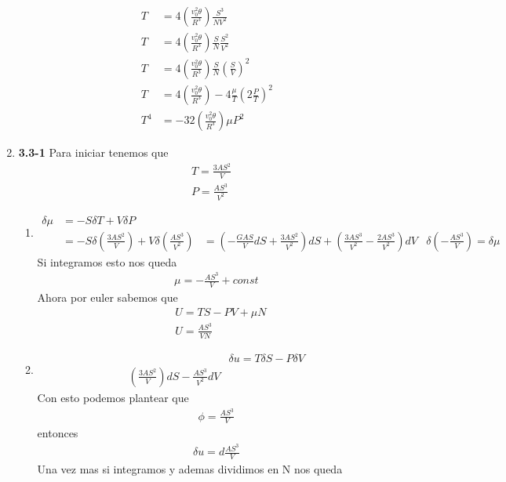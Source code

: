 \documentclass[12pt]{exam}
\begin{document}
\begin{enumerate}
		\begin{align*}
			T &= 4\left(\frac{v_0^2\theta}{R^3}\right)\frac{S^3}{NV^2}\\
			T &= 4\left(\frac{v_0^2\theta}{R^3}\right)\frac{S}{N}\frac{S^2}{V^2}\\
			T &= 4\left(\frac{v_0^2\theta}{R^3}\right)\frac{S}{N}\left(\frac{S}{V}\right)^2\\
			T &= 4\left(\frac{v_0^2\theta}{R^3}\right)-4\frac{\mu}{T}\left(2\frac{P}{T}\right)^2\\
			T^4 &= -32\left(\frac{v_0^2\theta}{R^3}\right)\mu P^2
		\end{align*}
	\item \textbf{3.3-1}
		Para iniciar tenemos que
		\begin{align*}
			&T=\frac{3AS^2}{V}\\
			&P=\frac{AS^3}{V^2}
		\end{align*}
		\begin{enumerate}
			\item \begin{align*}
					\delta \mu &= -S\delta T + V\delta P\\
					&= -S\delta \left(\frac{3AS^2}{V}\right)+ V\delta\left(\frac{AS^3}{V^2}\right)
					&= \left(-\frac{GAS}{V}dS+\frac{3AS^2}{V^2}\right)dS+\left(\frac{3AS^3}{V^2}-\frac{2AS^3}{V^2}\right)dV
					&\delta(-\frac{AS^3}{V})=\delta \mu
			\end{align*}
				Si integramos esto nos queda
				\begin{align*}
					\mu = -\frac{AS^3}{V}+ const
				\end{align*}
				Ahora por euler sabemos que
				\begin{align*}
					&U = TS-PV+\mu N\\
					&U=\frac{AS^3}{VN}
				\end{align*}
			\item
				\begin{align*}
					&\delta u = T\delta S - P\delta V\\
					\left(\frac{3AS^2}{V}\right)dS-\frac{AS^3}{V^2}dV
				\end{align*}
				Con esto podemos plantear que
				\begin{align*}
					\phi = \frac{AS^3}{V}
				\end{align*}
				entonces
				\begin{align*}
					\delta u = d\frac{AS^3}{V}
				\end{align*}
				Una vez mas si integramos y ademas dividimos en N nos queda
				\begin{align*}

\end{align*}
\end{enumerate}
\end{enumerate}
\end{document}
